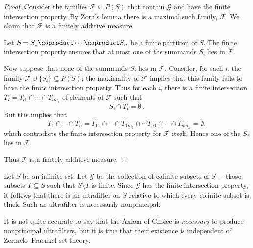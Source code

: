 \begin{proof}
	Consider the families $ \mathscr{F} \subseteq P(S) $
	that contain $ \mathscr{G} $ and
	have the finite intersection property.
	By Zorn's lemma there is a maximal such family, $ \mathscr{F} $.
	We claim that $ \mathscr{F} $ is a finitely additive measure.
	
	Let $ S = S_1 \coproduct \cdots \coproduct S_n $
	be a finite partition of $ S $.
	The finite intersection property ensures that
	at most one of the summands $ S_i $ lies in $ \mathscr{F} $.
	
	Now suppose that
	none of the summands $ S_i $ lies in $ \mathscr{F} $.
	Consider, for each $ i $,
	the family $ \mathscr{F} \cup \{ S_i \} \subseteq P(S) $;
	the maximality of $ \mathscr{F} $ implies that
	this family fails to have the finite intersection property. 
	Thus for each $ i $, there is a finite intersection
	$ T_i = T_{i1} \cap \cdots \cap T_{im_i} $
	of elements of $ \mathscr{F} $ such that 
	\[
		S_i \cap T_i = \emptyset \period
	\]
	But this implies that
	\[
		T_1 \cap \cdots \cap T_n = 
		T_{11} \cap \cdots \cap T_{1m_1} \cap
		\cdots
		T_{n1} \cap \cdots \cap T_{nm_n}
		= \emptyset \comma
	\]
	which contradicts the finite intersection property
	for $ \mathscr{F} $ itself.
	Hence one of the $ S_i $ lies in $ \mathscr{F} $.

	Thus $ \mathscr{F} $ is a finitely additive measure. 
\end{proof}

\begin{eg}
	Let $ S $ be an infinite set.
	Let $ \mathscr{G} $ be the collection of
	cofinite subsets of $ S $ −
	those subsets $ T \subseteq S $ such that
	$ S \setminus T $ is finite.
	Since $ \mathscr{G} $ has the finite intersection property,
	it follows that there is an ultrafilter on $ S $
	relative to which 
	every cofinite subset is thick.
	Such an ultrafilter is necessarily nonprincipal.
\end{eg}

\begin{nul}
	It is not quite accurate to say that
	the Axiom of Choice is \emph{necessary}
	to produce nonprincipal ultrafilters, but
	it is true that their existence is
	independent of Zermelo--Fraenkel set theory.
\end{nul}

